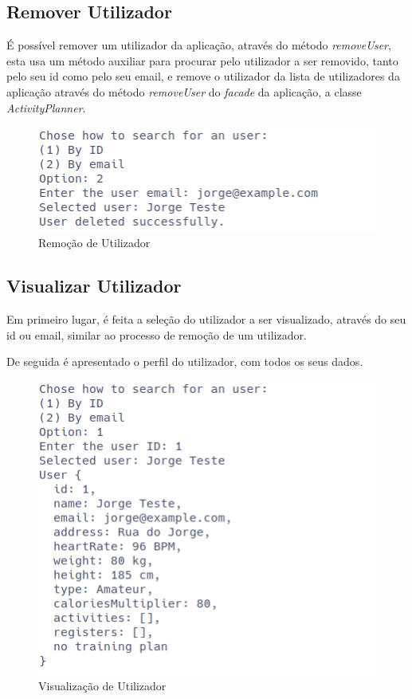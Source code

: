 \documentclass[a4paper,12pt]{scrreprt}
\begin{document}
    \clearpage
    \subsection{Remover Utilizador}
    É possível remover um utilizador da aplicação, através do método \textit{removeUser},
    esta usa um método auxiliar para procurar pelo utilizador a ser removido,
    tanto pelo seu id como pelo seu email,
    e remove o utilizador da lista de utilizadores da aplicação através do método \textit{removeUser}
    do \textit{facade} da aplicação, a classe \textit{ActivityPlanner}.

    \begin{figure}[!ht]
        \centering
        \includegraphics[width=\textwidth]{images/deleteUser.png}
        \caption{Remoção de Utilizador}
        \label{fig:remove-user}
    \end{figure}

    \clearpage
    \subsection{Visualizar Utilizador}
    Em primeiro lugar, é feita a seleção do utilizador a ser visualizado, através do seu id ou email,
    similar ao processo de remoção de um utilizador.

    De seguida é apresentado o perfil do utilizador, com todos os seus dados.

    \begin{figure}[!ht]
        \centering
        \includegraphics[width=\textwidth]{images/viewUser.png}
        \caption{Visualização de Utilizador}
        \label{fig:view-user}
    \end{figure}
\end{document}
